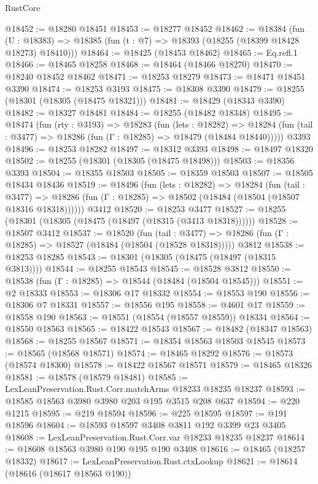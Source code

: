 \begin{lexlean}{RustCore}
\begin{coremodule}
@18452 := @18280 @18451
@18453 := @18277 @18452
@18462 := @18384
    (fun (U : @18383) => @18385 (fun (t : @7) => @18393 (@18255 (@18399 @18428 @18273) @18410)))
@18464 := @18425 (@18453 @18462)
@18465 := Eq.refl.{1}
@18466 := @18465 @18258
@18468 := @18464 (@18466 @18270)
@18470 := @18240 @18452 @18462
@18471 := @18253 @18279
@18473 := @18471 @18451 @3390
@18474 := @18253 @3193
@18475 := @18308 @3390
@18479 := @18255 (@18301 (@18305 (@18475 @18321)))
@18481 := @18429 (@18343 @3390)
@18482 := @18327 @18481
@18484 := @18255 (@18482 @18348)
@18495 := @18474
    (fun (rty : @3193) =>
    @18283
      (fun (lets : @18282) =>
      @18284 (fun (tail : @3477) => @18286 (fun (Γ : @18285) => @18479 (@18484 @18440)))))
    @3393
@18496 := @18253 @18282
@18497 := @18312 @3393
@18498 := @18497 @18320
@18502 := @18255 (@18301 (@18305 (@18475 @18498)))
@18503 := @18356 @3393
@18504 := @18355 @18503
@18505 := @18359 @18503
@18507 := @18505 @18434 @18436
@18519 := @18496
    (fun (lets : @18282) =>
    @18284
      (fun (tail : @3477) =>
      @18286 (fun (Γ : @18285) => @18502 (@18484 (@18504 (@18507 @18316 @18318))))))
    @3412
@18520 := @18253 @3477
@18527 := @18255 (@18301 (@18305 (@18475 (@18497 (@18315 (@3413 @18318))))))
@18528 := @18507 @3412
@18537 := @18520
    (fun (tail : @3477) => @18286 (fun (Γ : @18285) => @18527 (@18484 (@18504 (@18528 @18318)))))
    @3812
@18538 := @18253 @18285
@18543 := @18301 (@18305 (@18475 (@18497 (@18315 @3813))))
@18544 := @18255 @18543
@18545 := @18528 @3812
@18550 := @18538 (fun (Γ : @18285) => @18544 (@18484 (@18504 @18545)))
@18551 := @2 @18333
@18553 := @18306 @17 @18332
@18554 := @18553 @190
@18556 := @18306 @7 @18331
@18557 := @18556 @195
@18558 := @4601 @17
@18559 := @18558 @190
@18563 := @18551 (@18554 (@18557 @18559)) @18334
@18564 := @18550 @18563
@18565 := @18422 @18543
@18567 := @18482 (@18347 @18563)
@18568 := @18255 @18567
@18571 := @18354 @18563 @18503 @18545
@18573 := @18565 (@18568 @18571)
@18574 := @18465 @18292
@18576 := @18573 (@18574 @18300)
@18578 := @18422 @18567 @18571
@18579 := @18465 @18326
@18581 := @18578 (@18579 @18481)
@18585 := LexLeanPreservation.Rust.Corr.matchArms @18233 @18235 @18237
@18593 := @18585 @18563 @3980 @3980 @203 @195 @3515 @208 @637
@18594 := @220 @1215
@18595 := @219 @18594
@18596 := @225 @18595
@18597 := @191 @18596
@18604 := @18593 @18597 @3408 @3811 @192 @3399 @23 @3405
@18608 := LexLeanPreservation.Rust.Corr.var @18233 @18235 @18237
@18614 := @18608 @18563 @3980 @190 @195 @190 @3408
@18616 := @18465 (@18257 @18332)
@18617 := LexLeanPreservation.Rust.ctxLookup
@18621 := @18614 (@18616 (@18617 @18563 @190))

\end{coremodule}
\end{lexlean}

